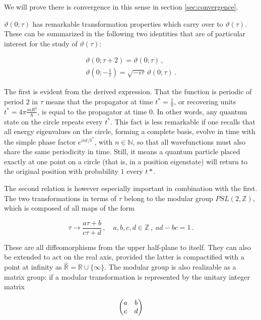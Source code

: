 \documentclass{article}
\newcommand{\T}{\ensuremath{\vartheta}}
\begin{document}
We will prove there is convergence in this sense in section \ref{sec:convergence}.

$\vartheta(0;\tau)$ has remarkable transformation properties which carry over to $\T(\tau)$. These can be summarized in the following two identities that are of particular interest for the study of $\T(\tau)$:

\begin{align}
    \vartheta(0; \tau + 2) = \vartheta(0; \tau)\,, \label{t2map}\\
    \vartheta(0; -\tfrac{1}{\tau}) = \sqrt{-i\tau} \, \vartheta(0; \tau)\,. \label{smap}
\end{align}

The first is evident from the derived expression. That the function is periodic of period $2$ in $\tau$ means that the propagator at time $t^* = \frac{1}{\pi}$, or recovering units $t^* = 4\pi \frac{mR^2}{\hbar}$, is equal to the propagator at time $0$. In other words, any quantum state on the circle repeats every $t^*$. This fact is less remarkable if one recalls that all energy eigenvalues on the circle, forming a complete basis, evolve in time with the simple phase factor $e^{int/t^*}$, with $n\in \mathbb{N}$, so that all wavefunctions must also share the same periodicity in time. Still, it means a quantum particle placed exactly at one point on a circle (that is, in a position eigenstate) will return to the original position with probability $1$ every $t*$.

\newcommand{\modg}{PSL(2,\mathbb{Z})}

The second relation is however especially important in combination with the first. The two transformations in terms of $\tau$ belong to the modular group $\modg$, which is composed of all maps of the form

\begin{equation}
    \tau \rightarrow \frac{a \tau + b}{c\tau + d}\,, \quad a,b,c,d \in \mathbb{Z}\,,\; ad - bc = 1\,.
\end{equation}

These are all diffeomorphisms from the upper half-plane to itself. They can also be extended to act on the real axis, provided the latter is compactified with a point at infinity as $\hat{\mathbb{R}} = \mathbb{R} \cup \{\infty\}$. The modular group is also realizable as a matrix group: if a modular transformation is represented by the unitary integer matrix

\begin{equation}
    \mqty( a & b \\ c & d)
\end{equation}
\end{document}

